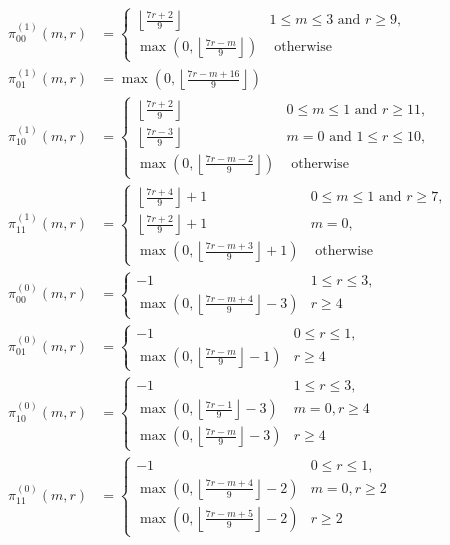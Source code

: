 \documentclass[reqno]{amsart}
\theoremstyle{definition}
\theoremstyle{remark}
\numberwithin{equation}{section}
\begin{document}
\begin{align*}
\pi^{(1)}_{00}(m,r) &=\begin{cases}
\left\lfloor \frac{7r+2}{9} \right\rfloor & 1\le m\le 3\text{ and } r\ge 9,\\
\max\left(0,\left\lfloor \frac{7r-m}{9} \right\rfloor\right)& \text{ otherwise}\end{cases}\\
\pi^{(1)}_{01}(m,r) &=\max\left(0,\left\lfloor \frac{7r-m+16}{9} \right\rfloor\right)\\
\pi^{(1)}_{10}(m,r) &=\begin{cases}
\left\lfloor \frac{7r+2}{9} \right\rfloor & 0\le m\le 1\text{ and } r\ge 11,\\
\left\lfloor \frac{7r-3}{9} \right\rfloor & m=0\text{ and } 1\le r\le 10,\\
\max\left(0,\left\lfloor \frac{7r-m-2}{9} \right\rfloor\right)& \text{ otherwise}
\end{cases}\\
\pi^{(1)}_{11}(m,r) &=\begin{cases}
\left\lfloor \frac{7r+4}{9} \right\rfloor + 1 & 0\le m\le 1\text{ and } r\ge 7,\\
\left\lfloor \frac{7r+2}{9} \right\rfloor + 1 & m=0,\\
\max\left(0,\left\lfloor \frac{7r-m+3}{9} \right\rfloor + 1\right)& \text{ otherwise}
\end{cases}\\
\pi^{(0)}_{00}(m,r) &=\begin{cases} -1 & 1\le r\le 3,\\ \max\left(0,\left\lfloor \frac{7r-m+4}{9} \right\rfloor - 3\right) & r\ge 4 \end{cases}\\
\pi^{(0)}_{01}(m,r) &=\begin{cases} -1 & 0\le r\le 1,\\ \max\left(0,\left\lfloor \frac{7r-m}{9} \right\rfloor - 1\right) & r\ge 4 \end{cases}\\
\pi^{(0)}_{10}(m,r) &=\begin{cases}
 -1 & 1\le r\le 3,\\ 
\max\left(0,\left\lfloor \frac{7r-1}{9} \right\rfloor - 3\right) & m=0, r\ge 4 \\
\max\left(0,\left\lfloor \frac{7r-m}{9} \right\rfloor - 3\right) & r\ge 4
 \end{cases}\\
\pi^{(0)}_{11}(m,r) &=\begin{cases}
 -1 & 0\le r\le 1,\\
\max\left(0,\left\lfloor \frac{7r-m+4}{9} \right\rfloor-2\right) & m=0, r\ge 2\\
\max\left(0,\left\lfloor \frac{7r-m+5}{9} \right\rfloor-2\right) & r\ge 2
\end{cases}
\end{align*}
\end{document}
